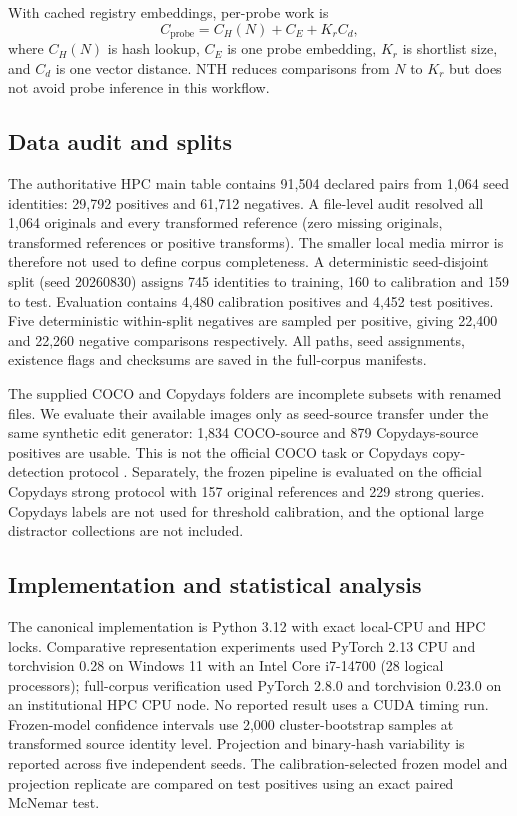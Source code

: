 \documentclass[12pt]{article}
\begin{document}
With cached registry embeddings, per-probe work is
\begin{equation}
 C_{\mathrm{probe}}=C_H(N)+C_E+K_r C_d,
\end{equation}
where $C_H(N)$ is hash lookup, $C_E$ is one probe embedding, $K_r$ is shortlist size, and $C_d$ is one vector distance. NTH reduces comparisons from $N$ to $K_r$ but does not avoid probe inference in this workflow.

\subsection{Data audit and splits}

The authoritative HPC main table contains 91,504 declared pairs from 1,064 seed identities: 29,792 positives and 61,712 negatives. A file-level audit resolved all 1,064 originals and every transformed reference (zero missing originals, transformed references or positive transforms). The smaller local media mirror is therefore not used to define corpus completeness. A deterministic seed-disjoint split (seed 20260830) assigns 745 identities to training, 160 to calibration and 159 to test. Evaluation contains 4,480 calibration positives and 4,452 test positives. Five deterministic within-split negatives are sampled per positive, giving 22,400 and 22,260 negative comparisons respectively. All paths, seed assignments, existence flags and checksums are saved in the full-corpus manifests.

The supplied COCO and Copydays folders are incomplete subsets with renamed files. We evaluate their available images only as seed-source transfer under the same synthetic edit generator: 1,834 COCO-source and 879 Copydays-source positives are usable. This is not the official COCO task \cite{lin2014coco} or Copydays copy-detection protocol \cite{jegou2008copydays}. Separately, the frozen pipeline is evaluated on the official Copydays strong protocol with 157 original references and 229 strong queries. Copydays labels are not used for threshold calibration, and the optional large distractor collections are not included.

\subsection{Implementation and statistical analysis}

The canonical implementation is Python 3.12 with exact local-CPU and HPC locks. Comparative representation experiments used PyTorch 2.13 CPU and torchvision 0.28 on Windows 11 with an Intel Core i7-14700 (28 logical processors); full-corpus verification used PyTorch 2.8.0 and torchvision 0.23.0 on an institutional HPC CPU node. No reported result uses a CUDA timing run. Frozen-model confidence intervals use 2,000 cluster-bootstrap samples at transformed source identity level. Projection and binary-hash variability is reported across five independent seeds. The calibration-selected frozen model and projection replicate are compared on test positives using an exact paired McNemar test.
\end{document}
